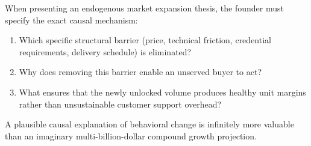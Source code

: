 When presenting an endogenous market expansion thesis, the founder must specify the exact causal mechanism:
\begin{enumerate}[leftmargin=12pt,itemsep=1pt,topsep=1pt,parsep=0pt]
  \item Which specific structural barrier (price, technical friction, credential requirements, delivery schedule) is eliminated?
  \item Why does removing this barrier enable an unserved buyer to act?
  \item What ensures that the newly unlocked volume produces healthy unit margins rather than unsustainable customer support overhead?
\end{enumerate}

A plausible causal explanation of behavioral change is infinitely more valuable than an imaginary multi-billion-dollar compound growth projection.

